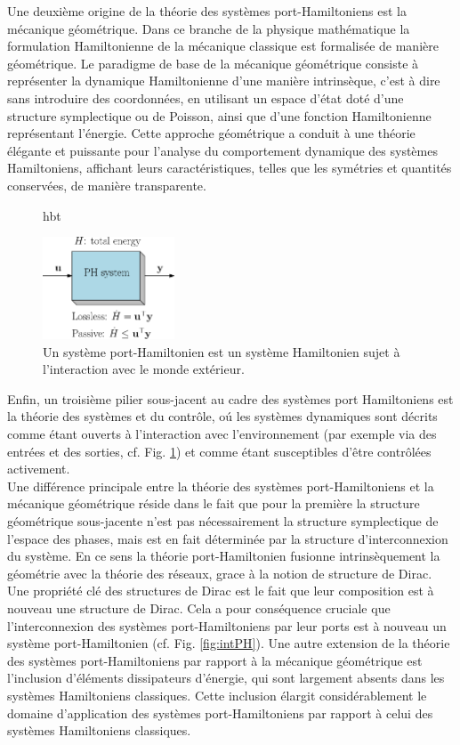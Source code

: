 \documentclass[12pt, french]{article}
\begin{document}
Une deuxième origine de la théorie des systèmes port-Hamiltoniens est la mécanique géométrique. Dans ce branche de la physique mathématique la formulation Hamiltonienne de la mécanique classique est formalisée de manière géométrique. Le paradigme de base
de la mécanique géométrique consiste à représenter la dynamique Hamiltonienne d'une manière intrinsèque, c'est à dire sans introduire des coordonnées, en utilisant un espace d'état doté d'une structure symplectique ou de Poisson, ainsi que d'une fonction Hamiltonienne représentant l'énergie. Cette
approche géométrique a conduit à une théorie élégante et puissante pour
l'analyse du comportement dynamique des systèmes Hamiltoniens, affichant leurs caractéristiques, telles que les symétries et quantités conservées, de manière transparente. \\

\begin{figure}{hbt}
	\begin{center}
		\includegraphics[width=0.35\textwidth]{sketch_PH.eps}
	\end{center}
	\caption{Un système port-Hamiltonien est un système Hamiltonien sujet \`a l'interaction avec le monde extérieur.}
	\label{fig:sketchPH}
\end{figure}

Enfin, un troisième pilier sous-jacent au cadre des systèmes port Hamiltoniens est la théorie des systèmes et du contrôle, o\'u les systèmes dynamiques sont décrits comme étant ouverts à l'interaction avec l'environnement (par exemple via des entrées et des sorties, cf. Fig. \ref{fig:sketchPH}) et comme étant susceptibles d'être contrôlées activement. \\


Une différence principale entre la théorie des systèmes port-Hamiltoniens et la mécanique géométrique réside dans le fait que pour la première la structure géométrique sous-jacente n'est pas nécessairement la structure symplectique de l'espace des phases, mais est en fait déterminée par la structure d'interconnexion du système.  En ce sens la théorie port-Hamiltonien fusionne intrinsèquement la géométrie avec la théorie des réseaux, grace \`a la notion de structure de Dirac. Une propriété clé des structures de Dirac est le fait que leur composition est à nouveau une structure de Dirac. Cela a pour conséquence cruciale que l'interconnexion des systèmes port-Hamiltoniens par leur ports est à nouveau un système port-Hamiltonien (cf. Fig. \ref{fig:intPH}). Une autre extension de la théorie des systèmes port-Hamiltoniens par rapport à la mécanique géométrique est l'inclusion d'éléments dissipateurs d'énergie, qui sont largement absents dans les systèmes Hamiltoniens classiques. Cette inclusion élargit considérablement le domaine d'application des systèmes port-Hamiltoniens par rapport à celui des systèmes Hamiltoniens classiques. \\
\end{document}
